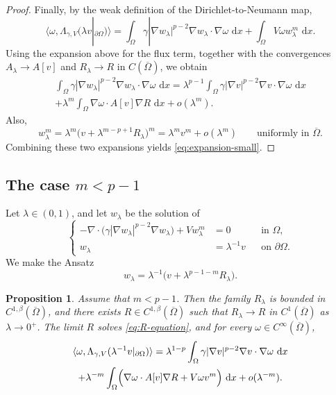 \documentclass[a4paper,12pt]{article}
\newcommand{\la}{\langle}
\newcommand{\ra}{\rangle}
\newcommand{\pr}{\partial}
\newcommand{\dd}{\,\mathrm{d}}
\newtheorem{prop}[thm]{Proposition}
\theoremstyle{definition}
\theoremstyle{remark}
\begin{document}
\begin{proof}
Finally, by the weak definition of the Dirichlet-to-Neumann map,
\[
\la\omega,\Lambda_{\gamma,V}(\lambda v|_{\pr\Omega})\ra
=\int_\Omega \gamma|\nabla w_\lambda|^{p-2}\nabla w_\lambda\cdot\nabla\omega\,\dd x
+\int_\Omega V\omega w_\lambda^m\,\dd x.
\]
Using the expansion above for the flux term, together with the convergences $A_\lambda\to A[v]$ and $R_\lambda\to R$ in $C(\overline\Omega)$, we obtain
\begin{multline*}
\int_\Omega \gamma|\nabla w_\lambda|^{p-2}\nabla w_\lambda\cdot\nabla\omega\,\dd x
=\lambda^{p-1}\int_\Omega \gamma|\nabla v|^{p-2}\nabla v\cdot\nabla\omega\,\dd x\\[5pt]
+\lambda^m\int_\Omega \nabla\omega\cdot A[v]\nabla R\,\dd x+o(\lambda^m).
\end{multline*}
Also,
\[
w_\lambda^m=\lambda^m\bigl(v+\lambda^{m-p+1}R_\lambda\bigr)^m
=\lambda^m v^m+o(\lambda^m)
\qquad\text{uniformly in }\overline\Omega.
\]
Combining these two expansions yields \eqref{eq:expansion-small}.
\end{proof}

\subsection{The case $m<p-1$}

Let $\lambda\in(0,1)$, and let $w_\lambda$ be the solution of
\begin{equation}\label{eq:w-lambda-large}
\left\{
\begin{aligned}
-\nabla\cdot\bigl(\gamma|\nabla w_\lambda|^{p-2}\nabla w_\lambda\bigr)+Vw_\lambda^m&=0 &&\text{in }\Omega,\\
 w_\lambda&=\lambda^{-1}v &&\text{on }\pr\Omega.
\end{aligned}
\right.
\end{equation}
We make the Ansatz
\begin{equation}\label{eq:ansatz-large}
w_\lambda=\lambda^{-1}\bigl(v+\lambda^{p-1-m}R_\lambda\bigr).
\end{equation}

\begin{prop}\label{prop:large-data}
Assume that $m<p-1$. Then the family $R_\lambda$ is bounded in $C^{1,\beta}(\overline\Omega)$, and there exists $R\in C^{1,\beta}(\overline\Omega)$ such that $R_\lambda\to R$ in $C^1(\overline\Omega)$ as $\lambda\to0^+$. The limit $R$ solves \eqref{eq:R-equation}, and for every $\omega\in C^\infty(\overline\Omega)$,
\begin{multline}\label{eq:expansion-large}
\la\omega,\Lambda_{\gamma,V}(\lambda^{-1}v|_{\pr\Omega})\ra
=\lambda^{1-p}\int_\Omega \gamma|\nabla v|^{p-2}\nabla v\cdot\nabla\omega\,\dd x\\
+\lambda^{-m}\int_\Omega\Bigl(\nabla\omega\cdot A[v]\nabla R+V\omega v^m\Bigr)\,\dd x+o(\lambda^{-m}).
\end{multline}
\end{prop}
\end{document}
